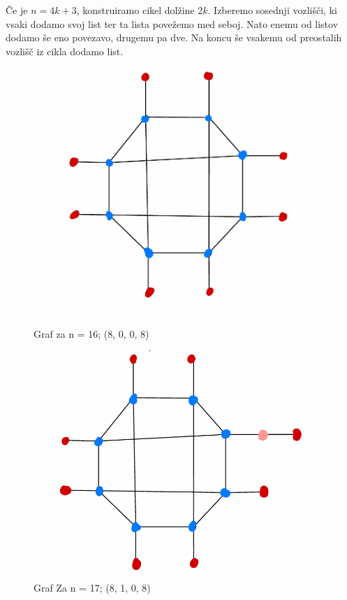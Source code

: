 \documentclass{article}
\begin{document}
Če je $n = 4k + 3$, konstruiramo cikel dolžine $2k$. Izberemo sosednji vozlišči, ki vsaki dodamo svoj list
ter ta lista povežemo med seboj. Nato enemu od listov dodamo še eno povezavo, drugemu pa dve. Na koncu 
še vsakemu od preostalih vozlišč iz cikla dodamo list. \\




\begin{figure}[H]
    \centering
    \begin{minipage}{0.48\textwidth}
        \centering
        \includegraphics[width=\textwidth]{grafza16.png}
        \caption*{Graf za n = 16; (8, 0, 0, 8)}
    \end{minipage}
    \hfill
    \begin{minipage}{0.48\textwidth}
        \centering
        \includegraphics[width=\textwidth]{grafza17.png}
        \caption*{Graf Za n = 17; (8, 1, 0, 8)}
    \end{minipage}


\end{figure}
\end{document}
